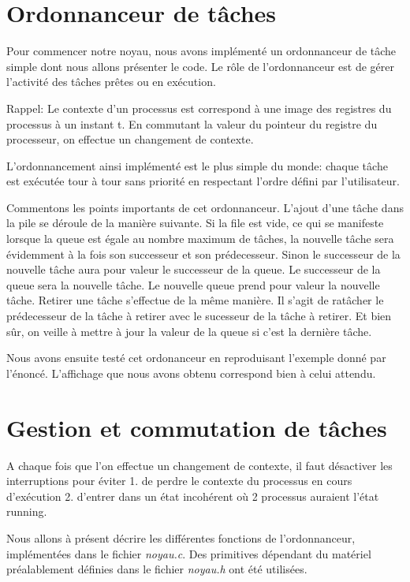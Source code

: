 \section{Ordonnanceur de tâches}
Pour commencer notre noyau, nous avons implémenté un ordonnanceur de tâche simple dont nous allons présenter le code. Le rôle de l'ordonnanceur est de gérer l'activité des tâches prêtes ou en exécution.

Rappel: Le contexte d'un processus est correspond à une image des registres du processus à un instant t. En commutant la valeur du pointeur du registre du processeur, on effectue un changement de contexte.


L'ordonnancement ainsi implémenté est le plus simple du monde: chaque tâche est exécutée tour à tour sans priorité en respectant l'ordre défini par l'utilisateur.

Commentons les points importants de cet ordonnanceur. L'ajout d'une tâche dans la pile se déroule de la manière suivante. Si la file est vide, ce qui se manifeste lorsque la queue est égale au nombre maximum de tâches, la nouvelle tâche sera évidemment à la fois son successeur et son prédecesseur. Sinon le successeur de la nouvelle tâche aura pour valeur le successeur de la queue. Le successeur de la queue sera la nouvelle tâche. Le nouvelle queue prend pour valeur la nouvelle tâche. Retirer une tâche s'effectue de la même manière. Il s'agit de ratâcher le prédecesseur de la tâche à retirer avec le sucesseur de la tâche à retirer. Et bien sûr, on veille à mettre à jour la valeur de la queue si c'est la dernière tâche.

Nous avons ensuite testé cet ordonanceur en reproduisant l'exemple donné par l'énoncé. L'affichage que nous avons obtenu correspond bien à celui attendu.


\section{Gestion et commutation de tâches}
A chaque fois que l'on effectue un changement de contexte, il faut désactiver les interruptions pour éviter 1. de perdre le contexte du processus en cours d'exécution 2. d'entrer dans un état incohérent où 2 processus auraient l'état running.

Nous allons à présent décrire les différentes fonctions de l'ordonnanceur, implémentées dans le fichier \textit{noyau.c}. Des primitives dépendant du matériel préalablement définies dans le fichier \textit{noyau.h} ont été utilisées.

